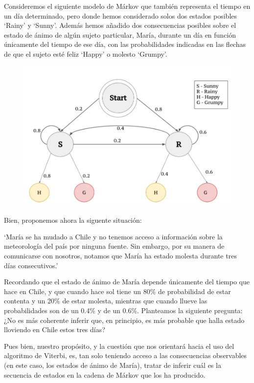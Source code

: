 \documentclass{article}
\begin{document}
\newpage
Consideremos el siguiente modelo de Márkov que también representa el tiempo en un día determinado, pero donde hemos considerado solos dos estados posibles `Rainy' y `Sunny'. Además hemos
añadido dos consecuencias posibles sobre el estado
de ánimo de algún sujeto particular, María, durante un día en función únicamente del tiempo de ese día, con las probabilidades indicadas
en las flechas de que el sujeto esté feliz `Happy' o 
molesto `Grumpy'.


\begin{figure}[H]
    \centering
    \includegraphics[scale=0.40]{Images/hmm.png}
\end{figure}

Bien, proponemos ahora la siguente situación:

\medskip
`María se ha mudado a Chile y no tenemos acceso a información sobre la meteorología del país por ninguna fuente. Sin embargo, por su manera
de comunicarse con nosotros, notamos que María ha estado
molesta durante tres días consecutivos.'
\medskip

Recordando que el estado de ánimo de María depende únicamente
del tiempo que hace en Chile, y que cuando hace sol tiene
un 80\% de probabilidad de estar contenta y un 20\% de estar molesta, mientras que cuando llueve las probabilidades son de un 0.4\% y de un 0.6\%. Planteamos la siguiente pregunta: ¿No es más
coherente inferir que, en principio, es más probable que
halla estado lloviendo en Chile estos tres días? 

Pues bien, nuestro propósito, y la cuestión que nos orientará
hacia el uso del algoritmo de Viterbi, es, tan solo teniendo
acceso a las consecuencias observables (en este caso, los estados de ánimo de María), tratar de inferir cuál es la secuencia
de estados en la cadena de Márkov que los ha producido.
\end{document}
